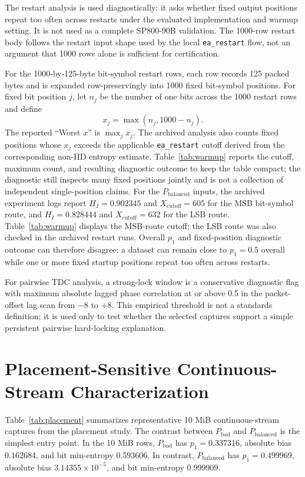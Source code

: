 \documentclass[journal]{IEEEtran}
\newcommand{\tdc}{TDC}
\newcommand{\spn}{SP800-90B}
\newcommand{\pbad}{$P_\mathrm{bad}$}
\newcommand{\pbal}{$P_\mathrm{balanced}$}
\begin{document}
The restart analysis is used diagnostically: it asks whether fixed output positions repeat too often across restarts under the evaluated implementation and warmup setting. It is not used as a complete \spn{} validation. The 1000-row restart body follows the restart input shape used by the local \texttt{ea\_restart} flow, not an argument that 1000 rows alone is sufficient for certification.

For the 1000-by-125-byte bit-symbol restart rows, each row records 125 packed bytes and is expanded row-preservingly into 1000 fixed bit-symbol positions. For fixed bit position $j$, let $n_j$ be the number of one bits across the 1000 restart rows and define
\begin{equation}
  x_j = \max(n_j, 1000-n_j).
\end{equation}
The reported ``Worst $x$'' is $\max_j x_j$. The archived analysis also counts fixed positions whose $x_j$ exceeds the applicable \texttt{ea\_restart} cutoff derived from the corresponding non-IID entropy estimate. Table~\ref{tab:warmup} reports the cutoff, maximum count, and resulting diagnostic outcome to keep the table compact; the diagnostic still inspects many fixed positions jointly and is not a collection of independent single-position claims. For the \pbal{} inputs, the archived experiment logs report $H_I=0.902345$ and $X_\mathrm{cutoff}=605$ for the MSB bit-symbol route, and $H_I=0.828444$ and $X_\mathrm{cutoff}=632$ for the LSB route. Table~\ref{tab:warmup} displays the MSB-route cutoff; the LSB route was also checked in the archived restart runs. Overall $p_1$ and fixed-position diagnostic outcome can therefore disagree: a dataset can remain close to $p_1=0.5$ overall while one or more fixed startup positions repeat too often across restarts.

For pairwise \tdc{} analysis, a strong-lock window is a conservative diagnostic flag with maximum absolute lagged phase correlation at or above 0.5 in the packet-offset lag scan from $-8$ to $+8$. This empirical threshold is not a standards definition; it is used only to test whether the selected captures support a simple persistent pairwise hard-locking explanation.

\section{Placement-Sensitive Continuous-Stream Characterization}

Table~\ref{tab:placement} summarizes representative 10 MiB continuous-stream captures from the placement study. The contrast between \pbad{} and \pbal{} is the simplest entry point. In the 10 MiB rows, \pbad{} has $p_1=0.337316$, absolute bias 0.162684, and bit min-entropy 0.593606. In contrast, \pbal{} has $p_1=0.499969$, absolute bias $3.14355\times 10^{-5}$, and bit min-entropy 0.999909.
\end{document}
